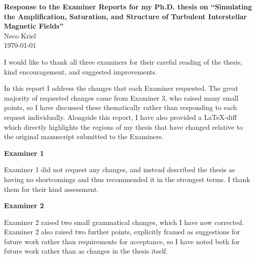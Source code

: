 \documentclass[11pt,a4paper]{article}
\date{}
\newcommand{\centeredrule}{%
    \par\noindent
    \makebox[\textwidth][c]{\rule{0.75\textwidth}{0.5pt}}
    \par
}
\begin{document}
\begin{center}
    {\Large\bfseries Response to the Examiner Reports for my Ph.D. thesis on ``Simulating the Amplification, Saturation, and Structure of Turbulent Interstellar Magnetic Fields''}\\[0.75em]
    {\Large Neco Kriel}\\[0.5 em]
    \today
\end{center}

\vspace{0.5cm}

I would like to thank all three examiners for their careful reading of the thesis, kind encouragement, and suggested improvements.

In this report I address the changes that each Examiner requested. The great majority of requested changes came from Examiner 3, who raised many small points, so I have discussed these thematically rather than responding to each request individually. Alongside this report, I have also provided a \LaTeX-diff which directly highlights the regions of my thesis that have changed relative to the original manuscript submitted to the Examiners.

\vspace{0.25cm}
\centeredrule
\vspace{0.25cm}

\begin{center}
    {\large\bfseries Examiner 1}
\end{center}

Examiner 1 did not request any changes, and instead described the thesis as having no shortcomings and thus recommended it in the strongest terms. I thank them for their kind assessment.

\vspace{0.25cm}
\centeredrule
\vspace{0.25cm}

\begin{center}
    {\large\bfseries Examiner 2}
\end{center}

Examiner 2 raised two small grammatical changes, which I have now corrected. Examiner 2 also raised two further points, explicitly framed as suggestions for future work rather than requirements for acceptance, so I have noted both for future work rather than as changes in the thesis itself.

\vspace{0.25cm}
\centeredrule
\vspace{0.25cm}
\end{document}
